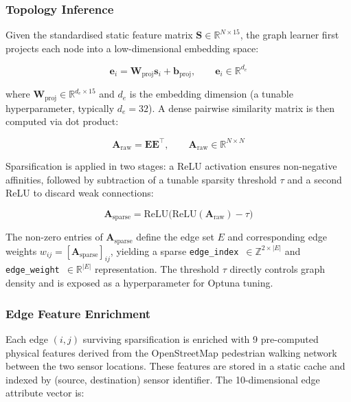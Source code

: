 \subsubsection{Topology Inference}

Given the standardised static feature matrix $\mathbf{S} \in \mathbb{R}^{N \times 15}$, the graph learner first projects each node into a low-dimensional embedding space:

\begin{equation}
    \mathbf{e}_i = \mathbf{W}_{\text{proj}} \mathbf{s}_i + \mathbf{b}_{\text{proj}}, \qquad \mathbf{e}_i \in \mathbb{R}^{d_e}
    \label{eq:graph-projection}
\end{equation}

\noindent where $\mathbf{W}_{\text{proj}} \in \mathbb{R}^{d_e \times 15}$ and $d_e$ is the embedding dimension (a tunable hyperparameter, typically $d_e = 32$). A dense pairwise similarity matrix is then computed via dot product:

\begin{equation}
    \mathbf{A}_{\text{raw}} = \mathbf{E}\mathbf{E}^{\top}, \qquad \mathbf{A}_{\text{raw}} \in \mathbb{R}^{N \times N}
    \label{eq:graph-similarity}
\end{equation}

\noindent Sparsification is applied in two stages: a ReLU activation ensures non-negative affinities, followed by subtraction of a tunable sparsity threshold $\tau$ and a second ReLU to discard weak connections:

\begin{equation}
    \mathbf{A}_{\text{sparse}} = \text{ReLU}\!\bigl(\text{ReLU}(\mathbf{A}_{\text{raw}}) - \tau\bigr)
    \label{eq:graph-sparsify}
\end{equation}

\noindent The non-zero entries of $\mathbf{A}_{\text{sparse}}$ define the edge set $E$ and corresponding edge weights $w_{ij} = [\mathbf{A}_{\text{sparse}}]_{ij}$, yielding a sparse \texttt{edge\_index}~$\in \mathbb{Z}^{2 \times |E|}$ and \texttt{edge\_weight}~$\in \mathbb{R}^{|E|}$ representation. The threshold $\tau$ directly controls graph density and is exposed as a hyperparameter for Optuna tuning.

\subsubsection{Edge Feature Enrichment}
\label{subsubsec:meth-edge-enrichment}

Each edge $(i, j)$ surviving sparsification is enriched with 9 pre-computed physical features derived from the OpenStreetMap pedestrian walking network between the two sensor locations. These features are stored in a static cache and indexed by (source, destination) sensor identifier. The 10-dimensional edge attribute vector is:

